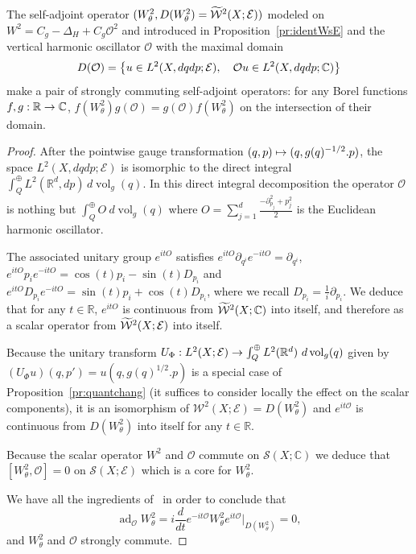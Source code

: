 \documentclass[10pt]{amsart}
\theoremstyle{definition}\newtheorem{defi}[theo]{Definition}\newtheorem{rema}[theo]{Remark}\newtheorem{exam}[theo]{Example}\newtheorem{exem}[theo]{Example}\newtheorem{nota}[theo]{Notation}
\newcommand{\C}{\mathbb{C}}
\newcommand{\R}{\mathbb{R}}
\newcommand{\clW}{\mathcal{W}}
\newcommand{\clO}{\mathcal{O}}
\newcommand{\clE}{\mathcal{E}}
\newcommand{\clS}{\mathcal{S}}
\DeclareMathOperator{\voll}{vol}
\DeclareMathOperator{\add}{ad}
\let\oldtilde\tilde
\renewcommand*{\tilde}[1]{\mathchoice{\widetilde{#1}}{\widetilde{#1}}{\oldtilde{#1}}{\oldtilde{#1}}}
\let\originalleft\left
\let\originalright\right
\renewcommand{\left}{\mathopen{}\mathclose\bgroup\originalleft}
\renewcommand{\right}{\aftergroup\egroup\originalright}
\renewcommand*{\to}{\mathchoice{\longrightarrow}{\rightarrow}{\rightarrow}{\rightarrow}}
\let\oldmapsto\mapsto
\renewcommand*{\mapsto}{\mathchoice{\longmapsto}{\oldmapsto}{\oldmapsto}{\oldmapsto}}
\begin{document}
\begin{prop}\label{pr:commut}
The self-adjoint operator $(W^{2}_{\theta},D(W^{2}_{\theta})=\tilde{\clW}^{2}(X;\clE))$ modeled on $W^{2}=C_{g}-\Delta_{H}+C_{g}\clO^{2}$ and introduced in Proposition~\ref{pr:identWsE} and the vertical harmonic oscillator $\clO$ with the maximal domain
\[
D(\clO)=\left\{u\in L^{2}(X,dqdp;\clE),\quad \clO u\in L^{2}(X,dqdp;\C)\right\}
\]
make a pair of strongly commuting self-adjoint operators: for any Borel functions $f,g:\R\to \C$, $f(W^{2}_{\theta})g(\clO)=g(\clO)f(W^{2}_{\theta})$ on the intersection of their domain.
\end{prop}

\begin{proof}
After the pointwise gauge transformation $(q,p)\mapsto (q,g(q)^{-1/2}.p)$, the space $L^{2}(X,dqdp;\clE)$ is isomorphic to the direct integral $\int_{Q}^{\oplus}L^{2}(\R^{d},dp)\,d\voll_{g}(q)$. In this direct integral decomposition the operator $\clO$ is nothing but $\int_{Q}^{\oplus}O~d\voll_{g}(q)$ where $O=\sum_{j=1}^{d}\frac{-\partial_{p_{j}}^{2}+p_{j}^{2}}{2}$ is the Euclidean harmonic oscillator.

The associated unitary group $e^{itO}$ satisfies $e^{itO}\partial_{q^{i}}e^{-itO}\!=\partial_{q^{i}}$, $e^{itO}p_{i}e^{-itO}\!=\cos(t)p_{i}-\sin(t)D_{p_{i}}$ and $e^{itO}D_{p_{i}}e^{-itO}=\sin(t)p_{i}+\cos(t)D_{p_{i}}$, where we recall $D_{p_i} = \frac{1}{i}\partial_{p_i}$. We deduce that for any $t\in \R$, $e^{itO}$ is continuous from $\tilde{\clW}^{2}(X;\C)$ into itself, and therefore as a scalar operator from $\tilde{\clW}^{2}(X;\clE)$ into itself.

Because the unitary transform $U_{\Phi}:L^{2}(X;\clE)\to \int_{Q}^{\oplus}L^{2}(\R^{d})~d\voll_{g}(q)$ given by $(U_{\Phi}u)(q,p')=u(q,g(q)^{1/2}.p)$ is a special case of Proposition~\ref{pr:quantchang} (it suffices to consider locally the effect on the scalar components), it is an isomorphism of $\clW^{2}(X;\clE)=D(W^{2}_{\theta})$ and $e^{it\clO}$ is continuous from $D(W^{2}_{\theta})$ into itself for any $t\in \R$.

Because the scalar operator $W^{2}$ and $\clO$ commute on $\clS(X;\C)$ we deduce that $[W^{2}_{\theta},\clO]=0$ on $\clS(X;\clE)$ which is a core for $W^{2}_{\theta}$.

We have all the ingredients of~\cite{ABG} in order to conclude that
\[
\add_{\clO}W^{2}_{\theta}=i\frac{d}{dt}e^{-it\clO}W_{\theta}^{2}e^{it\clO}\big|_{D(W^{2}_{\theta})}=0,
\]
and $W^{2}_{\theta}$ and $\clO$ strongly commute.
\end{proof}
\end{document}
